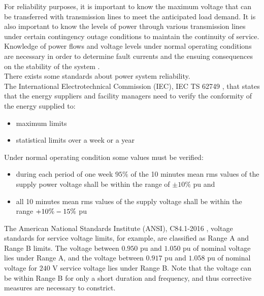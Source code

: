 For reliability purposes, it is important to know the maximum voltage that can be
transferred with transmission lines to meet the anticipated load demand. It is also important to know the levels of power through various transmission lines under certain contingency outage conditions to maintain the continuity of service. Knowledge of power flows and voltage levels under normal operating conditions are necessary in order to determine fault currents and the ensuing consequences on the stability of the system \cite{eps}. \\

\noindent There exists some standards about power system reliability. \\
The International Electrotechnical Commission (\gls{IEC}), IEC TS 62749 \cite{iec}, that states that the energy suppliers and facility managers need to verify the conformity of the energy supplied to:
\begin{itemize}
    \item maximum limits
    \item statistical limits over a week or a year
\end{itemize}
\noindent Under normal operating condition some values must be verified:
\begin{itemize}
    \item during each period of one week $95\%$ of the 10 minutes mean \gls{rms} values of the supply power voltage shall be within the range of $\pm10\%$ \gls{pu} and
    \item all 10 minutes mean \gls{rms} values of the supply voltage shall be within the range $+10\% \/ -15\%$ \gls{pu}
\end{itemize}

The American National Standards Institute (\gls{ANSI}), C84.1-2016 \cite{ansic84}, voltage standards for service voltage limits, for example, are classified as Range A and Range B limits. The voltage between $0.950$ \gls{pu} and $1.050$ \gls{pu} of nominal voltage lies under Range A, and the voltage between $0.917$ \gls{pu} and $1.058$ \gls{pu} of nominal voltage for $240$ \gls{V} service voltage lies under Range B. Note that the voltage can be within Range B for only a short duration and frequency, and thus corrective measures are necessary to constrict.


